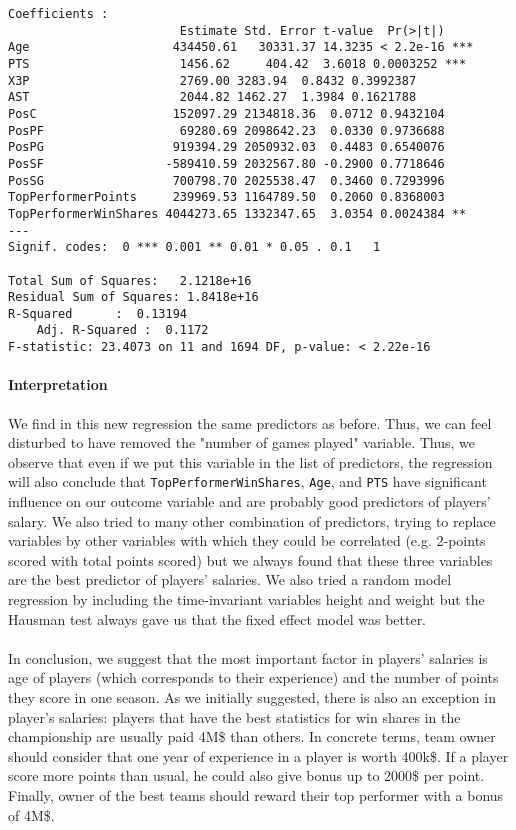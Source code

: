\begin{verbatim}
Coefficients :
                        Estimate Std. Error t-value  Pr(>|t|)	
Age                    434450.61   30331.37 14.3235 < 2.2e-16 ***
PTS                  	1456.62 	404.42  3.6018 0.0003252 ***
X3P                  	2769.00	3283.94  0.8432 0.3992387	
AST                  	2044.82	1462.27  1.3984 0.1621788	
PosC                   152097.29 2134818.36  0.0712 0.9432104	
PosPF                   69280.69 2098642.23  0.0330 0.9736688	
PosPG                  919394.29 2050932.03  0.4483 0.6540076	
PosSF                 -589410.59 2032567.80 -0.2900 0.7718646	
PosSG                  700798.70 2025538.47  0.3460 0.7293996	
TopPerformerPoints     239969.53 1164789.50  0.2060 0.8368003	
TopPerformerWinShares 4044273.65 1332347.65  3.0354 0.0024384 **
---
Signif. codes:  0 *** 0.001 ** 0.01 * 0.05 . 0.1   1
 
Total Sum of Squares:	2.1218e+16
Residual Sum of Squares: 1.8418e+16
R-Squared      :  0.13194
  	Adj. R-Squared :  0.1172
F-statistic: 23.4073 on 11 and 1694 DF, p-value: < 2.22e-16
\end{verbatim}

\paragraph{Interpretation}We find in this new regression the same predictors as before. Thus, we can feel disturbed to have removed the "number of games played" variable. Thus, we observe that even if we put this variable in the list of predictors, the regression will also conclude that \texttt{TopPerformerWinShares}, \texttt{Age}, and \texttt{PTS} have significant influence on our outcome variable and are probably good predictors of players' salary. We also tried to many other combination of predictors, trying to replace variables by other variables with which they could be correlated (e.g. 2-points scored with total points scored) but we always found that these three variables are the best predictor of players' salaries.
We also tried a random model regression by including the time-invariant variables height and weight but the Hausman test always gave us that the fixed effect model was better.

\paragraph{}In conclusion, we suggest that the most important factor in players' salaries is age of players (which corresponds to their experience) and the number of points they score in one season. As we initially suggested, there is also an exception in player's salaries: players that have the best statistics for win shares in the championship are usually paid 4M\$ than others. In concrete terms, team owner should consider that one year of experience in a player is worth 400k\$. If a player score more points than usual, he could also give bonus up to 2000\$ per point. Finally, owner of the best teams should reward their top performer with a bonus of 4M\$.
